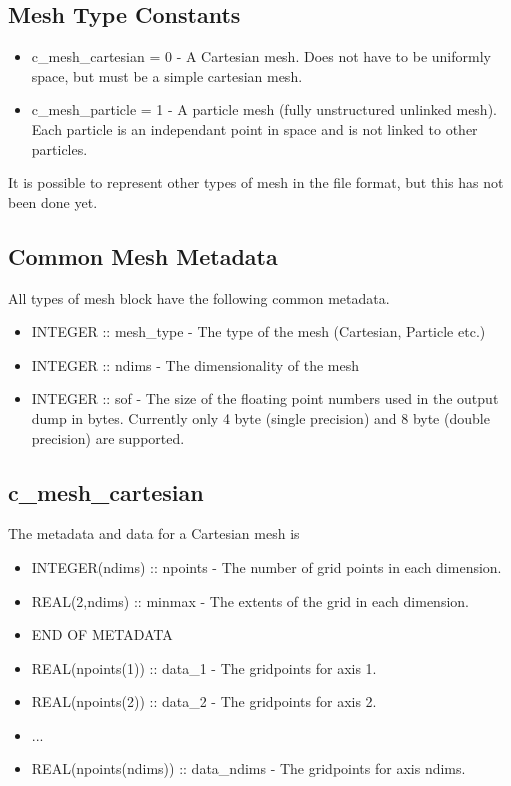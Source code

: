 \documentclass[8pt]{article}
\begin{document}
\subsection{Mesh Type Constants}
\begin{itemize}
\item c\_mesh\_cartesian = 0 - A Cartesian mesh. Does not have to be uniformly space, but must be a simple cartesian mesh.
\item c\_mesh\_particle = 1 - A particle mesh (fully unstructured unlinked mesh). Each particle is an independant point in space and is not linked to other particles.
\end{itemize}
It is possible to represent other types of mesh in the file format, but this has not been done yet.
\subsection{Common Mesh Metadata}
All types of mesh block have the following common metadata.
\begin{itemize}
  \item INTEGER :: mesh\_type - The type of the mesh (Cartesian, Particle etc.)
  \item INTEGER :: ndims - The dimensionality of the mesh
  \item INTEGER :: sof - The size of the floating point numbers used in the output dump in bytes. Currently only 4 byte (single precision) and 8 byte (double precision) are supported.
\end{itemize}
\subsection{c\_mesh\_cartesian}
The metadata and data for a Cartesian mesh is
\begin{itemize}
\item INTEGER(ndims) :: npoints - The number of grid points in each dimension.
\item REAL(2,ndims)  :: minmax - The extents of the grid in each dimension.
\item END OF METADATA
\item REAL(npoints(1)) :: data\_1 - The gridpoints for axis 1.
\item REAL(npoints(2)) :: data\_2 - The gridpoints for axis 2.
\item ...
\item REAL(npoints(ndims)) :: data\_ndims - The gridpoints for axis ndims.
\end{itemize}
\end{document}

